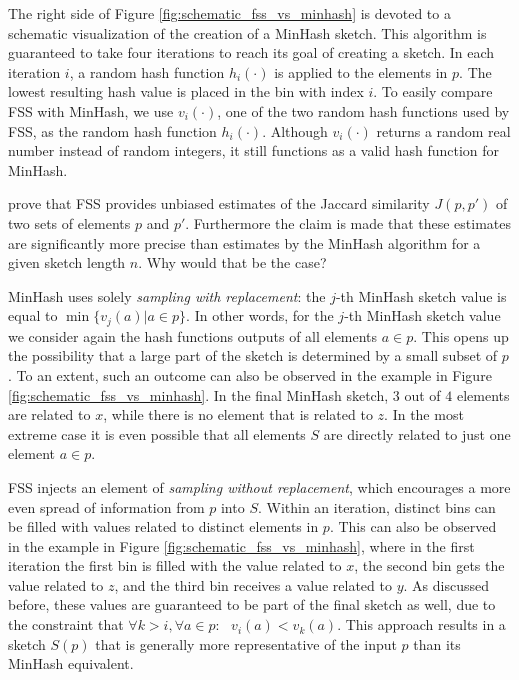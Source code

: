 The right side of Figure \ref{fig:schematic_fss_vs_minhash} is devoted to a schematic visualization of the creation of a MinHash sketch. This algorithm is guaranteed to take four iterations to reach its goal of creating a sketch. In each iteration $i$, a random hash function $h_i(\cdot)$ is applied to the elements in $p$. The lowest resulting hash value is placed in the bin with index $i$. To easily compare FSS with MinHash, we use $v_i(\cdot)$, one of the two random hash functions used by FSS, as the random hash function $h_i(\cdot)$. Although $v_i(\cdot)$ returns a random real number instead of random integers, it still functions as a valid hash function for MinHash. 

\cite{DahlgaardKT17} prove that FSS provides unbiased estimates of the Jaccard similarity $J(p,p')$ of two sets of elements $p$ and $p'$. Furthermore the claim is made that these estimates are significantly more precise than estimates by the MinHash algorithm for a given sketch length $n$. Why would that be the case? 

MinHash uses solely \textit{sampling with replacement}: the $j$-th MinHash sketch value is equal to $\min\{v_j(a) | a \in p\}$. In other words, for the $j$-th MinHash sketch value we consider again the hash functions outputs of all elements $a \in p$. This opens up the possibility that a large part of the sketch is determined by a small subset of $p$. To an extent, such an outcome can also be observed in the example in Figure \ref{fig:schematic_fss_vs_minhash}. In the final MinHash sketch, $3$ out of $4$ elements are related to $x$, while there is no element that is related to $z$. In the most extreme case it is even possible that all elements $S$ are directly related to just one element $a \in p$. 

FSS injects an element of \textit{sampling without replacement}, which encourages a more even spread of information from $p$ into $S$. Within an iteration, distinct bins can be filled with values related to distinct elements in $p$. This can also be observed in the example in Figure \ref{fig:schematic_fss_vs_minhash}, where in the first iteration the first bin is filled with the value related to $x$, the second bin gets the value related to $z$, and the third bin receives a value related to $y$. As discussed before, these values are guaranteed to be part of the final sketch as well, due to the constraint that $\forall k > i, \forall a \in p:\text{ } v_i(a) < v_k(a)$. This approach results in a sketch $S(p)$ that is generally more representative of the input $p$ than its MinHash equivalent.

